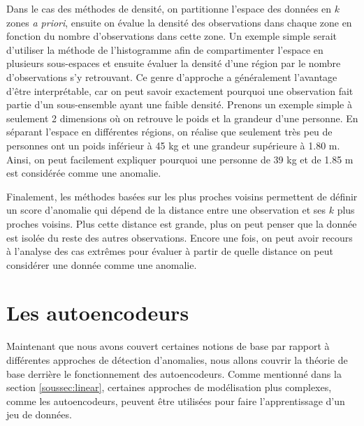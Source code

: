 Dans le cas des méthodes de densité, on partitionne l'espace des données en $k$ zones \textit{a priori}, ensuite on évalue la densité des observations dans chaque zone en fonction du nombre d'observations dans cette zone. Un exemple simple serait d'utiliser la méthode de l'histogramme afin de compartimenter l'espace en plusieurs sous-espaces et ensuite évaluer la densité d'une région par le nombre d'observations s'y retrouvant. Ce genre d'approche a généralement l'avantage d'être interprétable, car on peut savoir exactement pourquoi une observation fait partie d'un sous-ensemble ayant une faible densité. Prenons un exemple simple à seulement 2 dimensions où on retrouve le poids et la grandeur d'une personne. En séparant l'espace en différentes régions, on réalise que seulement très peu de personnes ont un poids inférieur à 45 kg et une grandeur supérieure à 1.80 m. Ainsi, on peut facilement expliquer pourquoi une personne de 39 kg et de 1.85 m est considérée comme une anomalie. 
 
 Finalement, les méthodes basées sur les plus proches voisins permettent de définir un score d'anomalie qui dépend de la distance entre une observation et ses $k$ plus proches voisins. Plus cette distance est grande, plus on peut penser que la donnée est isolée du reste des autres observations. Encore une fois, on peut avoir recours à l'analyse des cas extrêmes pour évaluer à partir de quelle distance on peut considérer une donnée comme une anomalie.


\section{Les autoencodeurs}

Maintenant que nous avons couvert certaines notions de base par rapport à différentes approches de détection d'anomalies, nous allons couvrir la théorie de base derrière le fonctionnement des autoencodeurs. Comme mentionné dans la section \ref{soussec:linear}, certaines approches de modélisation plus complexes, comme les autoencodeurs, peuvent être utilisées pour faire l'apprentissage d'un jeu de données. 

